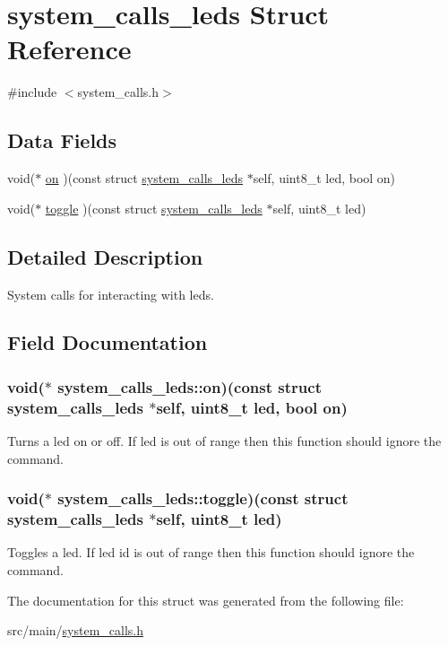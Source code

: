 \hypertarget{structsystem__calls__leds}{\section{system\+\_\+calls\+\_\+leds Struct Reference}
\label{structsystem__calls__leds}
}


{\ttfamily \#include $<$system\+\_\+calls.\+h$>$}

\subsection*{Data Fields}
\begin{DoxyCompactItemize}
\item 
void($\ast$ \hyperlink{structsystem__calls__leds_ac2bc481bb48583bd30826e57e6cd1b8d}{on} )(const struct \hyperlink{structsystem__calls__leds}{system\+\_\+calls\+\_\+leds} $\ast$self, uint8\+\_\+t led, bool on)
\item 
void($\ast$ \hyperlink{structsystem__calls__leds_abe9c78859a7f9799ba044dd800e1b9bf}{toggle} )(const struct \hyperlink{structsystem__calls__leds}{system\+\_\+calls\+\_\+leds} $\ast$self, uint8\+\_\+t led)
\end{DoxyCompactItemize}


\subsection{Detailed Description}
System calls for interacting with leds. 

\subsection{Field Documentation}
\hypertarget{structsystem__calls__leds_ac2bc481bb48583bd30826e57e6cd1b8d}{
\subsubsection[{on}]{\setlength{\rightskip}{0pt plus 5cm}void($\ast$ system\+\_\+calls\+\_\+leds\+::on)(const struct {\bf system\+\_\+calls\+\_\+leds} $\ast$self, uint8\+\_\+t led, bool on)}}\label{structsystem__calls__leds_ac2bc481bb48583bd30826e57e6cd1b8d}
Turns a led on or off. If led is out of range then this function should ignore the command. \hypertarget{structsystem__calls__leds_abe9c78859a7f9799ba044dd800e1b9bf}{
\subsubsection[{toggle}]{\setlength{\rightskip}{0pt plus 5cm}void($\ast$ system\+\_\+calls\+\_\+leds\+::toggle)(const struct {\bf system\+\_\+calls\+\_\+leds} $\ast$self, uint8\+\_\+t led)}}\label{structsystem__calls__leds_abe9c78859a7f9799ba044dd800e1b9bf}
Toggles a led. If led id is out of range then this function should ignore the command. 

The documentation for this struct was generated from the following file\+:\begin{DoxyCompactItemize}
\item 
src/main/\hyperlink{system__calls_8h}{system\+\_\+calls.\+h}\end{DoxyCompactItemize}
